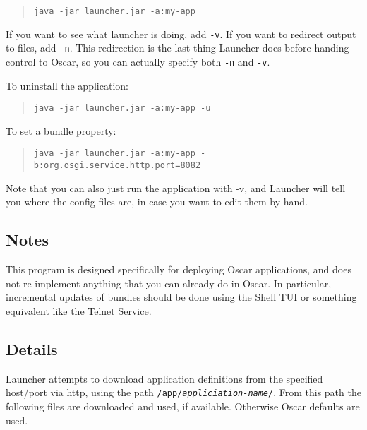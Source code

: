 \documentclass{report}
\begin{document}
\begin{quote}\begin{scriptsize}\begin{verbatim}    
java -jar launcher.jar -a:my-app
\end{verbatim}\end{scriptsize}\end{quote}
        
If you want to see what launcher is doing, add {\tt -v}. If you want to redirect 
output to files, add {\tt -n}. This redirection is the last thing Launcher does 
before handing control to Oscar, so you can actually specify both {\tt -n} and 
{\tt -v}.
        
To uninstall the application:
    
\begin{quote}\begin{scriptsize}\begin{verbatim}    
java -jar launcher.jar -a:my-app -u
\end{verbatim}\end{scriptsize}\end{quote}
        
To set a bundle property:
    
\begin{quote}\begin{scriptsize}\begin{verbatim}    
java -jar launcher.jar -a:my-app -b:org.osgi.service.http.port=8082
\end{verbatim}\end{scriptsize}\end{quote}
        
Note that you can also just run the application with -v, and Launcher will 
tell you where the config files are, in case you want to edit them by hand.

\subsection{Notes}
This program is designed specifically for deploying Oscar applications, 
and does not re-implement anything that you can already do in Oscar. In 
particular, incremental updates of bundles should be done using the Shell TUI 
or something equivalent like the Telnet Service.

\subsection{Details}
Launcher attempts to download application definitions from the 
specified host/port via http, using the path {\tt /app/{\it appliciation-name}/}. From 
this path the following files are downloaded and used, if available. Otherwise 
Oscar defaults are used.
\end{document}
